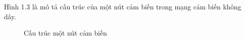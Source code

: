 Hình 1.3 là mô tả cấu trúc của một nút cảm biến trong mạng cảm biến không dây.


\begin{figure}[htb]
	\caption{\label{fig:my-label} Cấu trúc một nút cảm biến}
\end{figure}

